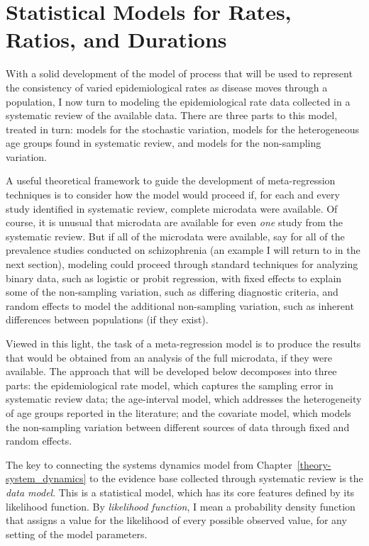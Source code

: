 \chapter{Statistical Models for Rates, Ratios, and Durations}
\label{theory-rate_model}

With a solid development of the model of process that will be used to
represent the consistency of varied epidemiological rates as disease
moves through a population, I now turn to modeling the
epidemiological rate data collected in a systematic review of the
available data.  There are three parts to this model, treated in turn:
models for the stochastic variation, models for the heterogeneous age
groups found in systematic review, and models for the non-sampling
variation.

A useful theoretical framework to guide the development of
meta-regression techniques is to consider how the model would proceed
if, for each and every study identified in systematic review, complete
microdata were available.  Of course, it is unusual that microdata are
available for even \emph{one} study from the systematic review.  But
if all of the microdata were available, say for all of the prevalence
studies conducted on schizophrenia (an example I will return to in
the next section), modeling could proceed through standard techniques
for analyzing binary data, such as logistic or probit regression, with
fixed effects to explain some of the non-sampling variation, such as
differing diagnostic criteria, and random effects to model the
additional non-sampling variation, such as inherent differences
between populations (if they exist).

Viewed in this light, the task of a meta-regression model is to
produce the results that would be obtained from an analysis of the
full microdata, if they were available. The approach that will be
developed below decomposes into three parts: the epidemiological rate
model, which captures the sampling error in systematic review data;
the age-interval model, which addresses the heterogeneity of age
groups reported in the literature; and the covariate model, which
models the non-sampling variation between different sources of data
through fixed and random effects.

The key to connecting the systems dynamics model from
Chapter~\ref{theory-system_dynamics} to the evidence base collected
through systematic review is the \emph{data model}.  This is a
statistical model, which has its core features defined by its
likelihood function.  By \emph{likelihood function}, I mean a
probability density function that assigns a value for the likelihood
of every possible observed value, for any setting of the model
parameters.

